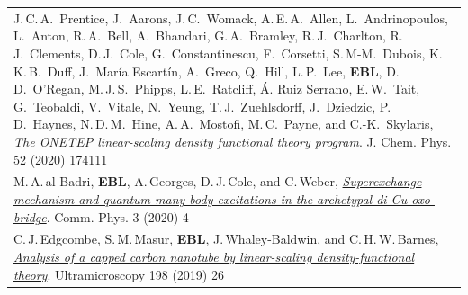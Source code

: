 \documentclass[10pt,a4paper,final]{article}
\begin{document}
\begin{tabularx}{\textwidth}{
   X}
   \footnotesize J.\,C.\,A.\ Prentice, J.\ Aarons, J.\,C.\ Womack, A.\,E.\,A.\ Allen, L.\ Andrinopoulos, L.\ Anton, R.\,A.\ Bell, A.\ Bhandari, G.\,A.\ Bramley, R.\,J.\ Charlton, R.\,J.\ Clements, D.\,J.\ Cole, G.\ Constantinescu, F.\ Corsetti, S.\,M-M.\ Dubois, K.\,K.\,B.\ Duff, J.\ María Escartín, A.\ Greco, Q.\ Hill, L.\,P.\ Lee, \textbf{EBL}, D.\,D.\ O’Regan, M.\,J.\,S.\ Phipps, L.\,E.\ Ratcliff, Á. Ruiz Serrano, E.\,W.\ Tait, G.\ Teobaldi, V.\ Vitale, N.\ Yeung, T.\,J.\ Zuehlsdorff, J.\ Dziedzic, P.\,D.\ Haynes, N.\,D.\,M.\ Hine, A.\,A.\ Mostofi, M.\,C.\ Payne, and C.-K.\ Skylaris, \href{https://aip.scitation.org/doi/full/10.1063/5.0004445}{\textit{The ONETEP linear-scaling density functional theory program}}. J. Chem. Phys. 52 (2020) 174111 \\ %
   \footnotesize M.\,A.\,al-Badri, \textbf{EBL}, A.\,Georges, D.\,J.\,Cole, and C.\,Weber, \href{https://www.nature.com/articles/s42005-019-0270-1}{\textit{Superexchange mechanism and quantum many body excitations in the archetypal di-Cu oxo-bridge}}. Comm. Phys. 3 (2020) 4                                                                                                                                                                                                                                                                                                                                                                                                                                                                                                   \\ %
   \footnotesize C.\,J.\,Edgcombe, S.\,M.\,Masur, \textbf{EBL}, J.\,Whaley-Baldwin, and C.\,H.\,W.\,Barnes, \href{https://www.sciencedirect.com/science/article/pii/S0304399118302833}{\textit{Analysis of a capped carbon nanotube by linear-scaling density-functional theory}}. Ultramicroscopy 198 (2019) 26                                                                                                                                                                                                                                                                                                                                                                                                                                                                     \\ %

\end{tabularx}
\end{document}
